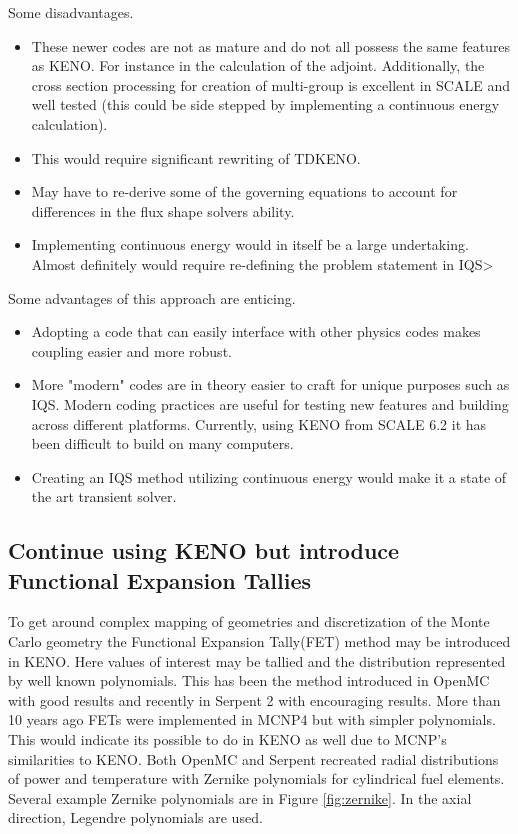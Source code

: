 \documentclass[11pt]{article}
\begin{document}
	Some disadvantages.
	\begin{itemize}
	\item These newer codes are not as mature and do not all possess the same features as KENO.  For instance in the calculation of the adjoint. Additionally, the cross section processing for creation of multi-group is excellent in SCALE and well tested (this could be side stepped by implementing a continuous energy calculation).
	\item This would require significant rewriting of TDKENO.  
	\item May have to re-derive some of the governing equations to account for differences in the flux shape solvers ability.
	\item Implementing continuous energy would in itself be a large undertaking.  Almost definitely would require re-defining the problem statement in IQS>  
	\end{itemize}
	 Some advantages of this approach are enticing.
	 
	\begin{itemize}
	\item Adopting a code that can easily interface with other physics codes makes coupling easier and more robust.  
	\item More "modern" codes are in theory easier to craft for unique purposes such as IQS.  Modern coding practices are useful for testing new features and building across different platforms.  Currently, using KENO from SCALE 6.2 it has been difficult to build on many computers.
	\item Creating an IQS method utilizing continuous energy would make it a state of the art transient solver.
	\end{itemize}	
	  
\subsection{Continue using KENO but introduce Functional Expansion Tallies}
To get around complex mapping of geometries and discretization of the Monte Carlo geometry the Functional Expansion Tally(FET) method may be introduced in KENO.  Here values of interest may be tallied and the distribution represented by well known polynomials.  This has been the method introduced in OpenMC with good results and recently in Serpent 2 with encouraging results.  More than 10 years ago FETs were implemented in MCNP4 \cite{griesheimer2004two} but with simpler polynomials. This would indicate its possible to do in KENO as well due to MCNP's similarities to KENO. Both OpenMC and Serpent recreated radial distributions of power and temperature with Zernike polynomials  for cylindrical fuel elements.  Several example Zernike polynomials are in Figure \ref{fig:zernike}. In the axial direction, Legendre polynomials are used. 
\end{document}
